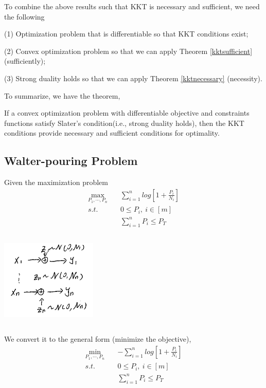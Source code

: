 To combine the above results such that KKT is necessary and sufficient, we need the following

	(1) Optimization problem that is differentiable so that KKT conditions exist;
	
	(2) Convex optimization problem so that we can apply Theorem \ref{kktsufficient} (sufficiently);
	
	(3) Strong duality holds so that we can apply Theorem \ref{kktnecessary} (necessity).

To summarize, we have the theorem,
\begin{theorem}
If a convex optimization problem with differentiable objective and constraints functions satisfy Slater's condition(i.e., strong duality holds), then the KKT conditions provide necessary and sufficient conditions for optimality. 
\end{theorem}





\vspace{0.5cm}
\subsection{Walter-pouring Problem}
Given the maximization problem
\begin{align*}
\max_{P_1,\cdots,P_n}\quad &\sum^n_{i=1}log[1+\frac{P_i}{N_i}]\\
s.t. \quad & 0 \leq P_i,\ i\in[m]\\
&\sum^n_{i=1}P_i\leq P_T
\end{align*}

\begin{marginfigure}
	\centering
	\includegraphics[width=1.8in,height=1.8in]{figures/ch10/figure1204_1.png}
\end{marginfigure}
We convert it to the general form (minimize the objective),
\begin{align*}
\min_{P_1,\cdots,P_n}\quad &-\sum^n_{i=1}log[1+\frac{P_i}{N_i}]\\
s.t. \quad & 0 \leq P_i,\ i\in[m]\\
&\sum^n_{i=1}P_i\leq P_T
\end{align*}

